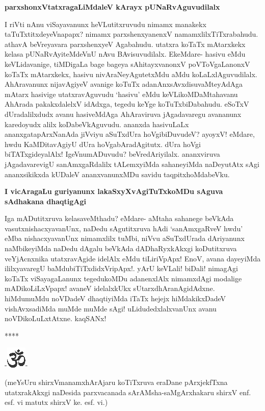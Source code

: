 \noindent
{\bf\large{parxshonxVtatxragaLiMdaleV kArayx pUNaRvAguvudilalx}}\label{page213}

I riVti nAnu viSayavanunx heVLutitxruvudu nimamx manakekx taTuTxtitxdeyeVnapapx? nimamx parxshenxyanenxV namamxlilxTiTxrabahudu. athavA beVreyavara parxshenxyeV Agabahudu. utatxra koTaTx mAtarxkekx kelasa pUNaRvAyiteMdeVnU nAvu BAvisuvudilalx. EkeMdare- hasivu eMdu keVLidavanige, tiMDigaLa bage bageya sAhitayxvanonxV poVToVgaLanonxV koTaTx mAtarxkekx, hasivu nivAraNeyAgutetxMdu aMdu koLaLxlAguvudilalx. AhAravanunx nijavAgiyeV avanige koTuTx adanAnxsAvxdisuvaMteyAdAga mAtarx hasivige utatxravAguvudu `hasivu' eMdu keVLikoMDaMtahavanu AhArada pakakxdalelxV idAdxga, tegedu keYge koTuTxbiDabahudu. eSoTxV dUradalilxdudx avanu hasiveMdAga AhAraviruva jAgadavaregu avananunx karedoyudx alilx koDabeVkAguvudu. ananxda hasivuLaLx ananxgatapArxNanAda jiVviyu aSuTxdUra hoVgibiDuvudeV? ayoyxV! eMdare, hwdu KaMDitavAgiyU dUra hoVgabAradAgitutx. dUra hoVgi biTATxgideyalAlx! IgeVnumADuvudu? beVredAriyilalx. ananxviruva jAgadavarevigU sanAmxgaRdalilx tALemxyiMda sahaneyiMda naDeyutAtx sAgi ananxsikikxda kUDaleV ananxvanunxMDu savidu taqpitxhoMdabeVku.

\noindent
{\bf\large{I vicAragaLu guriyanunx lakaSxyXvAgiTuTxkoMDu sAguva sAdhakana dhaqtigAgi}}\label{page218}

Iga mADutitxruva kelasaveMthadu? eMdare- aMtaha sahanege beVkAda vasutxnishacxyavanUnx, naDedu sAgutitxruva hAdi `sanAmxgaRveV hwdu' eMba nishacxyavanUnx nimamxlilx tuMbi, niVvu aSuTxdUrada dAriyanunx naMbikeyiMda naDedu dAgalu beVkAda dADhaRyxkAkxgi koDutitxruva veYjAcnxnika utatxravAgide idelAlx eMdu tiLiriVpApx! EnoV, avana dayeyiMda ililxyavaregU baMdubiTiTxdidxVripApx!. yArU keVLali! biDali! nimagAgi koTaTx viSayagaLanunx tegedukoMDu adanenxlAlx nimamxdAgi modalige mADikoLiLxVpapx! avaneV idelalxkUkx sUtarxdhAranAgidAdxne. hiMdumuMdu noVDadeV dhaqtiyiMda iTaTx hejejx hiMdakikxDadeV vishAvxsadiMda muMde muMde sAgi! uLidudedxlalxvanUnx avanu noVDikoLuLxtAtxne. kaqSANx!

\begin{center}
****
\end{center}

\begin{center}
-\includegraphics{om.eps}-
\end{center}

(meYsUru shirxVmanamxhArAjaru koTiTxruva eraDane pArxjekfTxna utatxrakAkxgi naDesida parxvacanada sArAMsha-saMgArxhakaru shirxV enf. esf. vi matutx shirxV ke. esf. vi.)


